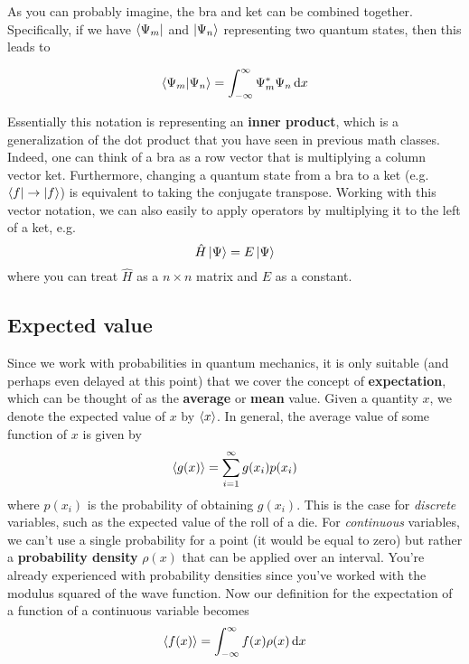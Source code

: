 As you can probably imagine, the bra and ket can be combined together. Specifically, if we have $\bra{\Psi_m}$ and $\ket{\Psi_n}$ representing two quantum states, then this leads to
\begin{tcolorbox}[title = Bra-ket inner product] \vspace{-2ex}
	\begin{equation}
		\braket{\Psi_m}{\Psi_n} = 
		\int_{-\infty}^{\infty} \Psi_m^*\Psi_n \dd{x} \label{eq:bk-int}
	\end{equation}
\end{tcolorbox}

Essentially this notation is representing an \textbf{inner product}, which is a generalization of the dot product that you have seen in previous math classes. Indeed, one can think of a bra as a row vector that is multiplying a column vector ket. Furthermore, changing a quantum state from a bra to a ket (e.g. $\bra{f} \rightarrow \ket{f}$) is equivalent to taking the conjugate transpose. Working with this vector notation, we can also easily to apply operators by multiplying it to the left of a ket, e.g.
\begin{equation*}
	\hat{H} \ket{\Psi} = E\ket{\Psi} 
\end{equation*}
where you can treat $\hat{H}$ as a $n\times n$ matrix and $E$ as a constant.


\subsection{Expected value}
Since we work with probabilities in quantum mechanics, it is only suitable (and perhaps even delayed at this point) that we cover the concept of \textbf{expectation}, which can be thought of as the \textbf{average} or \textbf{mean} value. Given a quantity $x$, we denote the expected value of $x$ by $\expval{x}$. In general, the average value of some function of $x$ is given by 
\begin{equation}
	\expval{g(x)} = \sum_{i=1}^{\infty} g(x_i) p(x_i)
\end{equation}
where $p(x_i)$ is the probability of obtaining $g(x_i)$. This is the case for \emph{discrete} variables, such as the expected value of the roll of a die. For \emph{continuous} variables, we can't use a single probability for a point (it would be equal to zero) but rather a \textbf{probability density} $\rho(x)$ that can be applied over an interval. You're already experienced with probability densities since you've worked with the modulus squared of the wave function. Now our definition for the expectation of a function of a continuous variable becomes
\begin{equation}
	\expval{f(x)} = \int_{-\infty}^{\infty} f(x) \rho(x) \dd{x}
\end{equation}

